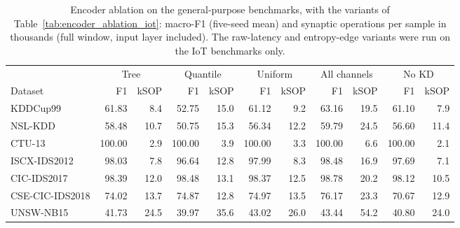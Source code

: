 \begin{table}[!t]
\centering
\caption{Encoder ablation on the general-purpose benchmarks, with the variants of Table~\ref{tab:encoder_ablation_iot}: macro-F1 (five-seed mean) and synaptic operations per sample in thousands (full window, input layer included). The raw-latency and entropy-edge variants were run on the IoT benchmarks only.}
\label{tab:encoder_ablation_general}
\footnotesize
\setlength{\tabcolsep}{4pt}
\begin{tabular}{lrrrrrrrrrr}
\toprule
& \multicolumn{2}{c}{Tree} & \multicolumn{2}{c}{Quantile} & \multicolumn{2}{c}{Uniform} & \multicolumn{2}{c}{All channels} & \multicolumn{2}{c}{No KD} \\
\cmidrule(lr){2-3} \cmidrule(lr){4-5} \cmidrule(lr){6-7} \cmidrule(lr){8-9} \cmidrule(lr){10-11}
Dataset & F1 & kSOP & F1 & kSOP & F1 & kSOP & F1 & kSOP & F1 & kSOP \\
\midrule
KDDCup99 & 61.83 & 8.4 & 52.75 & 15.0 & 61.12 & 9.2 & 63.16 & 19.5 & 61.10 & 7.9 \\
NSL-KDD & 58.48 & 10.7 & 50.75 & 15.3 & 56.34 & 12.2 & 59.79 & 24.5 & 56.60 & 11.4 \\
CTU-13 & 100.00 & 2.9 & 100.00 & 3.9 & 100.00 & 3.3 & 100.00 & 6.6 & 100.00 & 2.1 \\
ISCX-IDS2012 & 98.03 & 7.8 & 96.64 & 12.8 & 97.99 & 8.3 & 98.48 & 16.9 & 97.69 & 7.1 \\
CIC-IDS2017 & 98.39 & 12.0 & 98.48 & 13.1 & 98.37 & 12.5 & 98.78 & 20.2 & 98.12 & 10.5 \\
CSE-CIC-IDS2018 & 74.02 & 13.7 & 74.87 & 12.8 & 74.97 & 13.5 & 76.17 & 23.3 & 70.67 & 12.9 \\
UNSW-NB15 & 41.73 & 24.5 & 39.97 & 35.6 & 43.02 & 26.0 & 43.44 & 54.2 & 40.80 & 24.0 \\
\bottomrule
\end{tabular}
\end{table}
